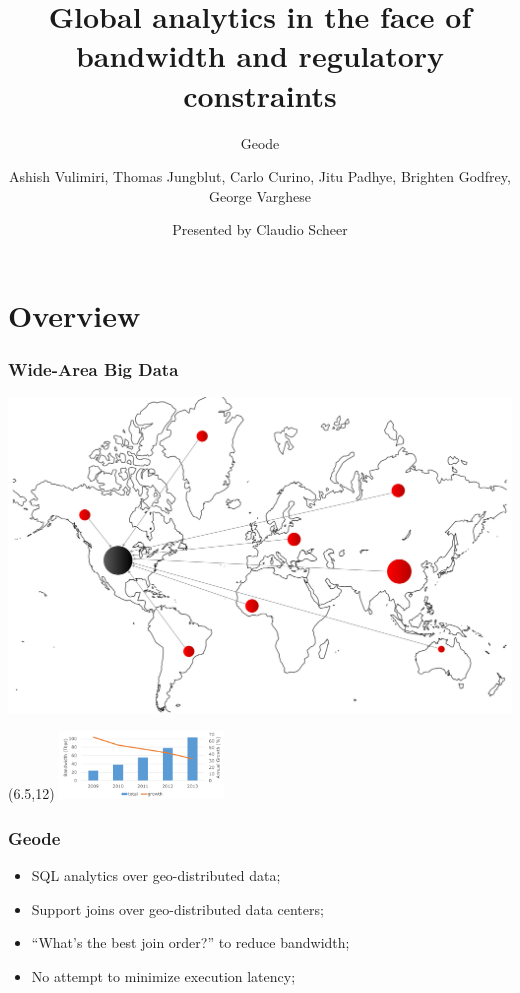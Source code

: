 \documentclass{beamer}
\title[Geode]
{Global analytics in the face of bandwidth and regulatory constraints}
\subtitle{Geode}
\author[Vulimiri et al., 2015]
{Ashish Vulimiri, Thomas Jungblut, Carlo Curino, Jitu Padhye, Brighten Godfrey, George Varghese}
\date[Big Data Infrastructure]
{Presented by Claudio Scheer}
\begin{document}
\frame{\titlepage}


\section{Overview}
\begin{frame}
	\frametitle{Wide-Area Big Data}

	\includegraphics[width=\textwidth]{./images/centralized.pdf}

	\begin{textblock}{1}(6.5,12)
		\includegraphics[height=1.8cm]{./images/internet-growth.png}
	\end{textblock}
\end{frame}

\begin{frame}
	\frametitle{Geode}

	\begin{itemize}
		\item SQL analytics over geo-distributed data;
		\item Support joins over geo-distributed data centers;
		\item ``What's the best join order?'' to reduce bandwidth;
		\item No attempt to minimize execution latency;
	\end{itemize}
\end{frame}
\end{document}
